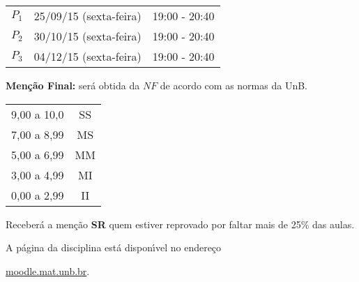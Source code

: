 \documentclass[12pt]{article}
\begin{document}
\begin{center}
    \begin{tabular}{c|c|c}
        \hline\hline
        \hspace{1cm}{\bf Prova}\hspace{1cm} & \hspace{3cm}{\bf Data}\hspace{3cm} & \hspace{1.7cm}{\bf Hor\'{a}rio}\hspace{1.7cm} \\
        \hline\hline
        $P_1$ & 25/09/15 (sexta-feira) \phantom{x} & 19:00 - 20:40 \\
        \hline
        $P_2$ & 30/10/15 (sexta-feira) \phantom{x} & 19:00 - 20:40 \\
        \hline
        $P_3$ & 04/12/15 (sexta-feira) \phantom{x} & 19:00 - 20:40 \\
        \hline\hline
    \end{tabular}
\end{center}

\vspace{0.5cm}
{\bf \noindent Men\c{c}\~{a}o Final:} ser\'{a} obtida da $NF$ de
acordo com as normas da UnB.
\begin{center}
    \begin{tabular}{c|c}
        \hline\hline
        \hspace{1cm}{Nota}\hspace{1cm} & \hspace{0.25cm}{Men\c{c}\~{a}o}\hspace{0.25cm}\\
        \hline\hline
        9,00 a 10,0 & SS \\
        \hline
        7,00 a 8,99 & MS \\
        \hline
        5,00 a 6,99 & MM \\
        \hline
        3,00 a 4,99 & MI \\
        \hline
        0,00 a 2,99  & II \\
        \hline\hline
    \end{tabular}
\end{center}
Receber{\'a} a men{\c c}{\~a}o {\bf SR} quem estiver reprovado por faltar mais de 25\%
das aulas.

\vspace{0.5cm}
 A p\'agina da disciplina est\'a dispon{\'\i}vel no endere\c{c}o
\begin{center}
    \url{moodle.mat.unb.br}.
\end{center}
\end{document}
